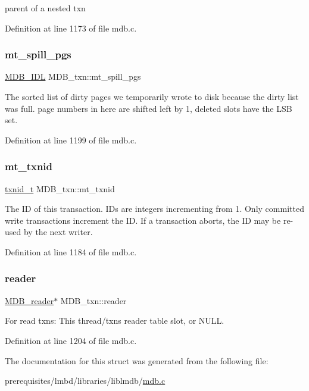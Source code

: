 parent of a nested txn 

Definition at line 1173 of file mdb.\+c.

\mbox{\label{struct_m_d_b__txn_a1a41741f6a5a601fd60fab7175285fd8}} 
\subsubsection{\texorpdfstring{mt\+\_\+spill\+\_\+pgs}{mt\_spill\_pgs}}
{\footnotesize\ttfamily \mbox{\hyperlink{group__idls_ga238cc39c422225e05cb3897e641ca9e5}{M\+D\+B\+\_\+\+I\+DL}} M\+D\+B\+\_\+txn\+::mt\+\_\+spill\+\_\+pgs}

The sorted list of dirty pages we temporarily wrote to disk because the dirty list was full. page numbers in here are shifted left by 1, deleted slots have the L\+SB set. 

Definition at line 1199 of file mdb.\+c.

\mbox{\label{struct_m_d_b__txn_a26512036328af11cdaeb6c9880859290}} 
\subsubsection{\texorpdfstring{mt\+\_\+txnid}{mt\_txnid}}
{\footnotesize\ttfamily \mbox{\hyperlink{group__internal_gabbaef7c9c710f8652a62c32d748c040e}{txnid\+\_\+t}} M\+D\+B\+\_\+txn\+::mt\+\_\+txnid}

The ID of this transaction. I\+Ds are integers incrementing from 1. Only committed write transactions increment the ID. If a transaction aborts, the ID may be re-\/used by the next writer. 

Definition at line 1184 of file mdb.\+c.

\mbox{\label{struct_m_d_b__txn_a0ca555e0c624a93f7106cfea434e9557}} 
\subsubsection{\texorpdfstring{reader}{reader}}
{\footnotesize\ttfamily \mbox{\hyperlink{struct_m_d_b__reader}{M\+D\+B\+\_\+reader}}$\ast$ M\+D\+B\+\_\+txn\+::reader}

For read txns\+: This thread/txn\textquotesingle{}s reader table slot, or N\+U\+LL. 

Definition at line 1204 of file mdb.\+c.



The documentation for this struct was generated from the following file\+:\begin{DoxyCompactItemize}
\item 
prerequisites/lmbd/libraries/liblmdb/\mbox{\hyperlink{mdb_8c}{mdb.\+c}}\end{DoxyCompactItemize}
